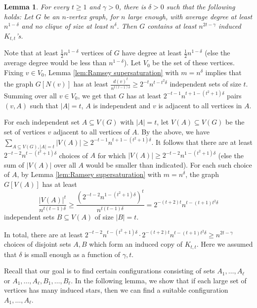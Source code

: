 \documentclass[11pt]{article}
\let\oldendproof\endproof
\renewenvironment{proof}[1][\proofname]{%
	\oldproof[\bf #1]%
}{\oldendproof}
\theoremstyle{plain}
\newtheorem{lemma}[theorem]{Lemma}
\begin{document}
\begin{lemma}\label{lem:lior}
	For every $t \geq 1$ and $\gamma > 0$, there is $\delta > 0$ such that the following holds: Let $G$ be an $n$-vertex graph, for $n$ large enough, with average degree at least $n^{1-\delta}$ and no clique of size at least $n^{\delta}$. Then $G$ contains at least $n^{2t-\gamma}$ induced $K_{t,t}$'s.
\end{lemma}
\begin{proof}
	Note that at least $\frac{1}{2} n^{1-\delta}$ vertices of $G$ have degree at least $\frac{1}{2} n^{1-\delta}$ (else the average degree would be less than $n^{1-\delta}$). 
    Let $V_0$ be the set of these vertices.
    Fixing $v \in V_0$, Lemma \ref{lem:Ramsey supersaturation} with $m=n^{\delta}$ implies that the graph $G[N(v)]$ has at least $\frac{d(v)^t}{n^{t(t-1)\delta}} \geq 2^{-t} n^{t-t^2\delta}$ independent sets of size $t$. Summing over all $v \in V_0$, we get that $G$ has at least $2^{-t-1} n^{t+1-(t^2+1)\delta}$ pairs $(v,A)$ such that $|A|=t$, $A$ is independent and $v$ is adjacent to all vertices in $A$.
  
    For each independent set $A \subseteq V(G)$ with $|A|=t$, let $V(A) \subseteq V(G)$ be the set of vertices $v$ adjacent to all vertices of $A$. By the above, we have 
    $\sum_{A \subseteq V(G), |A|=t} |V(A)| \geq 
    2^{-t-1} n^{t+1-(t^2+1)\delta}$. It follows that there are at least 
    $2^{-t-2} n^{t-(t^2+1)\delta}$ choices of $A$ for which $|V(A)| \geq 2^{-t-2} n^{1-(t^2+1)\delta}$ (else the sum of $|V(A)|$ over all $A$ would be smaller than indicated). For each such choice of $A$, by Lemma \ref{lem:Ramsey supersaturation} with $m=n^{\delta}$, the graph $G[V(A)]$ has at least 
    $$
    \frac{|V(A)|^t}{n^{t(t-1)\delta}} \geq
    \frac{(2^{-t-2} n^{1-(t^2+1)\delta})^t}{n^{t(t-1)\delta}} = 2^{-(t+2)t} n^{t-(t+1)t^2\delta}$$ independent sets $B \subseteq V(A)$ of size $|B|=t$.

    In total, there are at least $2^{-t-2} n^{t-(t^2+1)\delta} \cdot 2^{-(t+2)t} n^{t-(t+1)t^2\delta} \geq n^{2t-\gamma}$ choices of disjoint sets $A,B$ which form an induced copy of $K_{t,t}$. Here we assumed that $\delta$ is small enough as a function of $\gamma,t$. 
	\end{proof}

Recall that our goal is to find certain configurations consisting of sets $A_1,\dots,A_{\ell}$ or \linebreak $A_1,\dots,A_{\ell},B_1,\dots,B_{\ell}$. In the following lemma, we show that if each large set of vertices has many induced stars, then we can find a suitable configuration $A_1,\dots,A_{\ell}$.
\end{document}
